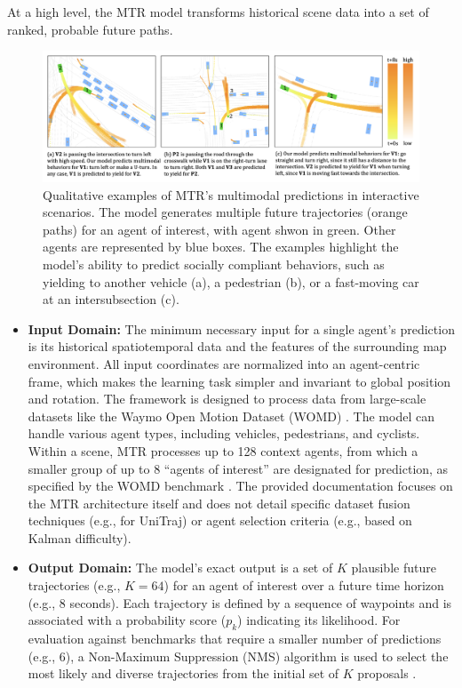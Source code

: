 At a high level, the MTR model transforms historical scene data into a set of ranked, probable future paths.

\begin{figure}[htbp]
    \centering
    \includegraphics[width=\textwidth]{figures/input_output_viz.png}
    \caption{Qualitative examples of MTR's multimodal predictions in interactive scenarios. The model generates multiple future trajectories (orange paths) for an agent of interest, with agent shwon in green. Other agents are represented by blue boxes. The examples highlight the model's ability to predict socially compliant behaviors, such as yielding to another vehicle (a), a pedestrian (b), or a fast-moving car at an intersubsection (c).}
    \label{fig:input_output_example}
\end{figure}

\begin{itemize}
    \item \textbf{Input Domain:} The minimum necessary input for a single agent's prediction is its historical spatiotemporal data and the features of the surrounding map environment. All input coordinates are normalized into an agent-centric frame, which makes the learning task simpler and invariant to global position and rotation. The framework is designed to process data from large-scale datasets like the Waymo Open Motion Dataset (WOMD) \cite{WOMD2021}. The model can handle various agent types, including vehicles, pedestrians, and cyclists. Within a scene, MTR processes up to 128 context agents, from which a smaller group of up to 8 ``agents of interest'' are designated for prediction, as specified by the WOMD benchmark \cite{WOMD2021}. The provided documentation focuses on the MTR architecture itself and does not detail specific dataset fusion techniques (e.g., for UniTraj) or agent selection criteria (e.g., based on Kalman difficulty).

    \item \textbf{Output Domain:} The model's exact output is a set of $K$ plausible future trajectories (e.g., $K=64$) for an agent of interest over a future time horizon (e.g., 8 seconds). Each trajectory is defined by a sequence of waypoints and is associated with a probability score ($p_k$) indicating its likelihood. For evaluation against benchmarks that require a smaller number of predictions (e.g., 6), a Non-Maximum Suppression (NMS) algorithm is used to select the most likely and diverse trajectories from the initial set of $K$ proposals \cite{Shi2022MTR}.
\end{itemize}

